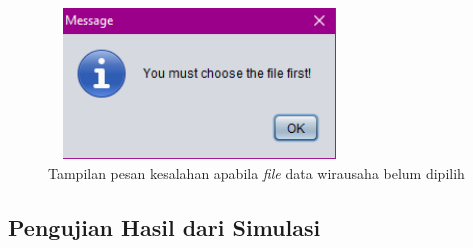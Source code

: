 	\begin{figure} [H]
	\centering  
	\includegraphics[width=8cm, height=4cm]{pesanError6} 
		\caption[Tampilan pesan kesalahan apabila \textit{file} data wirausaha belum dipilih]{Tampilan pesan kesalahan apabila \textit{file} data wirausaha belum dipilih}
	\label{pesanError6} 
\end{figure}

 
\subsection{Pengujian Hasil dari Simulasi}

